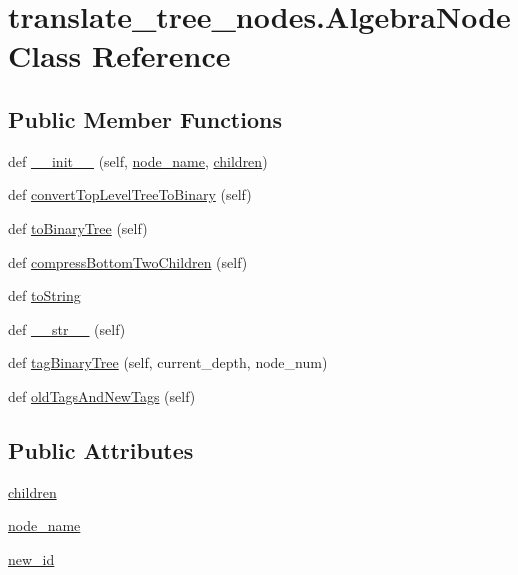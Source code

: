 \hypertarget{classtranslate__tree__nodes_1_1_algebra_node}{}\section{translate\+\_\+tree\+\_\+nodes.\+Algebra\+Node Class Reference}
\label{classtranslate__tree__nodes_1_1_algebra_node}
\subsection*{Public Member Functions}
\begin{DoxyCompactItemize}
\item 
def \hyperlink{classtranslate__tree__nodes_1_1_algebra_node_a9ac9e8b3121983d70eaca4aca26fc4fc}{\+\_\+\+\_\+init\+\_\+\+\_\+} (self, \hyperlink{classtranslate__tree__nodes_1_1_algebra_node_a1ce43e48160b84abc8847aac2daad122}{node\+\_\+name}, \hyperlink{classtranslate__tree__nodes_1_1_algebra_node_a03cc9dbcddb31a4b06f23b73046ee1d1}{children})
\item 
def \hyperlink{classtranslate__tree__nodes_1_1_algebra_node_a2505974def9029fda0d6ec1b3817853c}{convert\+Top\+Level\+Tree\+To\+Binary} (self)
\item 
def \hyperlink{classtranslate__tree__nodes_1_1_algebra_node_a253cbbed2e99544970f8b6cc332ef2e2}{to\+Binary\+Tree} (self)
\item 
def \hyperlink{classtranslate__tree__nodes_1_1_algebra_node_afbe5fdb0be62d22236ff698f9d969e63}{compress\+Bottom\+Two\+Children} (self)
\item 
def \hyperlink{classtranslate__tree__nodes_1_1_algebra_node_a628ca06aad3a58b8fe8215a7413c3e37}{to\+String}
\item 
def \hyperlink{classtranslate__tree__nodes_1_1_algebra_node_af97750d7635c161a5ac8c05fc0a066f0}{\+\_\+\+\_\+str\+\_\+\+\_\+} (self)
\item 
def \hyperlink{classtranslate__tree__nodes_1_1_algebra_node_a91ef0fed00104f4478df988e16937dbc}{tag\+Binary\+Tree} (self, current\+\_\+depth, node\+\_\+num)
\item 
def \hyperlink{classtranslate__tree__nodes_1_1_algebra_node_a39d416c5e3373e2074831354afc9a067}{old\+Tags\+And\+New\+Tags} (self)
\end{DoxyCompactItemize}
\subsection*{Public Attributes}
\begin{DoxyCompactItemize}
\item 
\hyperlink{classtranslate__tree__nodes_1_1_algebra_node_a03cc9dbcddb31a4b06f23b73046ee1d1}{children}
\item 
\hyperlink{classtranslate__tree__nodes_1_1_algebra_node_a1ce43e48160b84abc8847aac2daad122}{node\+\_\+name}
\item 
\hyperlink{classtranslate__tree__nodes_1_1_algebra_node_ae5b55b8b4bc4eb136d1f056e04419e78}{new\+\_\+id}
\end{DoxyCompactItemize}


